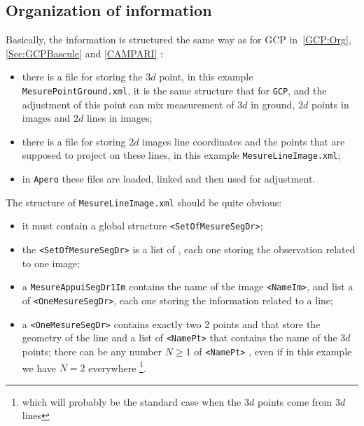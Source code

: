 
\subsection{Organization of information}

Basically, the information is structured the same way as for GCP in~\ref{GCP:Org},\ref{Sec:GCPBascule} and
\ref{CAMPARI} :

\begin{itemize}
   \item there is a file for storing the $3d$ point, in this example {\tt MesurePointGround.xml}, it is the same
         structure that for {\tt GCP}, and the adjustment of this point can mix measurement of $3d$ in ground,
         $2d$ points in images and $2d$ lines in images;

   \item there is a file for storing $2d$ images line coordinates and the points that are supposed to project
         on these lines, in this example {\tt MesureLineImage.xml};

   \item in {\tt Apero} these files are loaded, linked and then used for adjustment.
\end{itemize}

The structure of {\tt MesureLineImage.xml} should be quite obvious:

\begin{itemize}
   \item it must contain a global structure {\tt <SetOfMesureSegDr>};
   \item the {\tt <SetOfMesureSegDr>} is a list of {\tt <MesureAppuiSegDr1Im>}, each one
         storing the observation related to one image;
   \item a  {\tt MesureAppuiSegDr1Im} contains the name of the image {\tt <NameIm>}, and list a of {\tt <OneMesureSegDr>}, each one storing the information related to a line;

   \item a   {\tt <OneMesureSegDr>} contains exactly two $2$ points {\tt <Pt1Im>} and {\tt <Pt2Im>} that store
            the geometry of the line and a list of {\tt <NamePt>} that contains the name of the $3d$ points;
            there can be any number $N \geq 1$ of  {\tt <NamePt>} , even if in this example we
             have $N=2$ everywhere
             \footnote{which will probably be the standard case when the $3d$ points come from $3d$ lines}.

\end{itemize}

